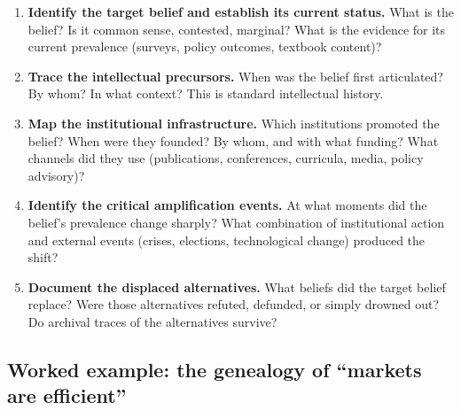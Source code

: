 \begin{enumerate}
  \item \textbf{Identify the target belief and establish its current status.}
  What is the belief?
  Is it common sense, contested, marginal?
  What is the evidence for its current prevalence (surveys, policy outcomes, textbook content)?

  \item \textbf{Trace the intellectual precursors.}
  When was the belief first articulated?
  By whom?
  In what context?
  This is standard intellectual history.

  \item \textbf{Map the institutional infrastructure.}
  Which institutions promoted the belief?
  When were they founded?
  By whom, and with what funding?
  What channels did they use (publications, conferences, curricula, media, policy advisory)?

  \item \textbf{Identify the critical amplification events.}
  At what moments did the belief's prevalence change sharply?
  What combination of institutional action and external events (crises, elections, technological change) produced the shift?

  \item \textbf{Document the displaced alternatives.}
  What beliefs did the target belief replace?
  Were those alternatives refuted, defunded, or simply drowned out?
  Do archival traces of the alternatives survive?
\end{enumerate}

\subsection{Worked example: the genealogy of ``markets are efficient''}

